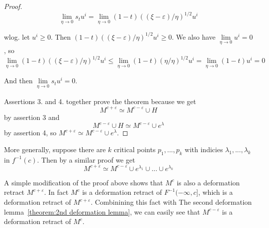 \begin{proof}
   \[ 
      \lim\limits_{\eta \to 0} s_t u^i 
      = \lim\limits_{\eta \to 0} (1 - t)((\xi - \varepsilon)/\eta)^{1/2}u^i
   \]

   wlog. let $u^i \geq 0$. Then $(1 - t)((\xi - \varepsilon)/\eta)^{1/2}u^i \geq 0$.
   We also have $\lim\limits_{\eta \to 0} u^i = 0$, so
   \[ 
      \lim\limits_{\eta \to 0} (1 - t)((\xi - \varepsilon)/\eta)^{1/2}u^i  
      \leq \lim\limits_{\eta \to 0} (1 - t)(\eta/\eta)^{1/2}u^i
      = \lim\limits_{\eta \to 0} (1 - t)u^i = 0
   \]

   And then $\lim\limits_{\eta \to 0} s_t u^i = 0$.
   
   Assertions 3. and 4. together prove the theorem because we get 
   \[ M^{c + \varepsilon} \simeq M^{c-\varepsilon} \cup H \]
   by assertion 3 and
   \[ M^{c-\varepsilon} \cup H \simeq M^{c - \varepsilon} \cup e^{\lambda} \]
   by assertion 4, so $M^{c + \varepsilon} \simeq M^{c - \varepsilon} \cup e^{\lambda}$.
 \end{proof}

\begin{remark}[Milnor]
   More generally, suppose there are $k$ critical points $p_1, ..., p_k$ with 
   indicies $\lambda_1, ..., \lambda_k$ in $f^{-1}(c)$. Then by a similar proof
   we get
   \[ 
      M^{c + \varepsilon} \simeq 
      M^{c - \varepsilon} \cup e^{\lambda_1} \cup ... \cup e^{\lambda_k} 
   \]
\end{remark}

\begin{remark}[Milnor]
   A simple modification of the proof above shows that $M^c$ is also a deformation
   retract $M^{c + \varepsilon}$. In fact $M^c$ is a deformation retract of 
   $F^{-1}(-\infty, c]$, which is a deformation retract of $M^{c + \varepsilon}$.
   Combinining this fact with The second deformation 
   lemma~\ref{theorem:2nd deformation lemma}, we can easily see that 
   $M^{c - \varepsilon}$ is a deformation retract of $M^c$.
\end{remark}
